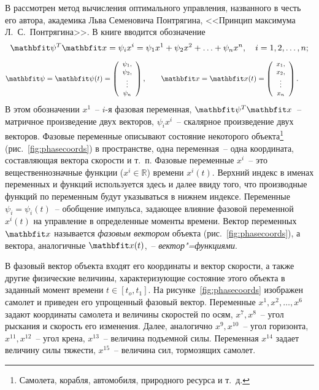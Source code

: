 \documentclass[a4paper,14pt, openany, twoside, final]{extbook} %
\begin{document}
В \cite{pontr} рассмотрен метод вычисления оптимального управления, названного в честь его автора, академика Льва Семеновича Понтрягина, <<Принцип максимума Л.~С.~Понтрягина>>.  В книге вводится обозначение
$$
\vecpsi^T\vecx=\psi_ix^i=\psi_1x^1+\psi_2x^2+\ldots +\psi_nx^n,\quad i=1,2,\ldots,n;
$$
$$
\vecpsi=\vecpsi(t)=\left({\small
  \begin{array}{c}
    \psi_1,\\ \psi_2,\\ \vdots\\ \psi_n
  \end{array}}
\right),\qquad\vecx=\vecx(t)=\left({\small
  \begin{array}{c}
    x_1,\\ x_2,\\ \vdots\\ x_n
  \end{array}}
\right).\qquad
$$
В этом обозначении $x^1$~-- $i$-я фазовая переменная, $\vecpsi^T\vecx$~-- матричное произведение двух векторов, $\psi_ix^i$~-- скалярное произведение двух векторов.  Фазовые переменные описывают состояние некоторого объекта\footnote{Самолета, корабля, автомобиля, природного ресурса и т.~д.} (рис.~\ref{fig:phasecoords}) в пространстве, одна переменная~-- одна координата, составляющая вектора скорости и т.~п.  Фазовые переменные $x^i$~-- это вещественнозначные функции ($x^i\in\mathbb{R}$) времени $x^i(t)$.  Верхний индекс в именах переменных и функций используется здесь и далее ввиду того, что производные функций по переменным будут указываться в нижнем индексе.  Переменные $\psi_i=\psi_i(t)$~-- обобщение импульса, задающее влияние фазовой переменной $x^i(t)$ на управление в определенные моменты времени.  Вектор переменных $\vecx$ называется \emph{фазовым вектором} объекта (рис.~\ref{fig:phasecoords}), а вектора, аналогичные $\vecx(t)$,~-- \emph{вектор"=функциями}.

В фазовый вектор объекта входят его координаты и вектор скорости, а также другие физические величины, характеризующие состояние этого объекта в заданный момент времени $t\in[t_o,t_1]$.  На рисунке~\ref{fig:phasecoords} изображен самолет и приведен его упрощенный фазовый вектор.  Переменные $x^1,x^2,\ldots,x^6$ задают координаты самолета и величины скоростей по осям, $x^7,x^8$~-- угол рыскания и скорость его изменения.  Далее, аналогично $x^9,x^{10}$~-- угол горизонта, $x^{11},x^{12}$~-- угол крена, $x^{13}$~-- величина подъемной силы.  Переменная $x^{14}$ задает величину силы тяжести, $x^{15}$~-- величина сил, тормозящих самолет.
\end{document}
